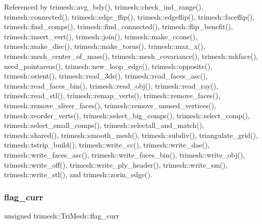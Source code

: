 Referenced by trimesh\+::avg\+\_\+bdy(), trimesh\+::check\+\_\+ind\+\_\+range(), trimesh\+::connected(), trimesh\+::edge\+\_\+flip(), trimesh\+::edgeflip(), trimesh\+::faceflip(), trimesh\+::find\+\_\+comps(), trimesh\+::find\+\_\+connected(), trimesh\+::flip\+\_\+benefit(), trimesh\+::insert\+\_\+vert(), trimesh\+::join(), trimesh\+::make\+\_\+ccone(), trimesh\+::make\+\_\+disc(), trimesh\+::make\+\_\+torus(), trimesh\+::max\+\_\+x(), trimesh\+::mesh\+\_\+center\+\_\+of\+\_\+mass(), trimesh\+::mesh\+\_\+covariance(), trimesh\+::mkface(), need\+\_\+pointareas(), trimesh\+::new\+\_\+loop\+\_\+edge(), trimesh\+::opposite(), trimesh\+::orient(), trimesh\+::read\+\_\+3ds(), trimesh\+::read\+\_\+faces\+\_\+asc(), trimesh\+::read\+\_\+faces\+\_\+bin(), trimesh\+::read\+\_\+obj(), trimesh\+::read\+\_\+ray(), trimesh\+::read\+\_\+stl(), trimesh\+::remap\+\_\+verts(), trimesh\+::remove\+\_\+faces(), trimesh\+::remove\+\_\+sliver\+\_\+faces(), trimesh\+::remove\+\_\+unused\+\_\+vertices(), trimesh\+::reorder\+\_\+verts(), trimesh\+::select\+\_\+big\+\_\+comps(), trimesh\+::select\+\_\+comp(), trimesh\+::select\+\_\+small\+\_\+comps(), trimesh\+::selectall\+\_\+and\+\_\+match(), trimesh\+::shared(), trimesh\+::smooth\+\_\+mesh(), trimesh\+::subdiv(), triangulate\+\_\+grid(), trimesh\+::tstrip\+\_\+build(), trimesh\+::write\+\_\+cc(), trimesh\+::write\+\_\+dae(), trimesh\+::write\+\_\+faces\+\_\+asc(), trimesh\+::write\+\_\+faces\+\_\+bin(), trimesh\+::write\+\_\+obj(), trimesh\+::write\+\_\+off(), trimesh\+::write\+\_\+ply\+\_\+header(), trimesh\+::write\+\_\+sm(), trimesh\+::write\+\_\+stl(), and trimesh\+::zorin\+\_\+edge().

\mbox{\label{classtrimesh_1_1TriMesh_acfada88d311cd48638cecd8a8acb2cf2}} 
\subsubsection{\texorpdfstring{flag\+\_\+curr}{flag\_curr}}
{\footnotesize\ttfamily unsigned trimesh\+::\+Tri\+Mesh\+::flag\+\_\+curr}

\mbox{\label{classtrimesh_1_1TriMesh_a96f4140c06e5f9f363dbff371b1ec137}} 
